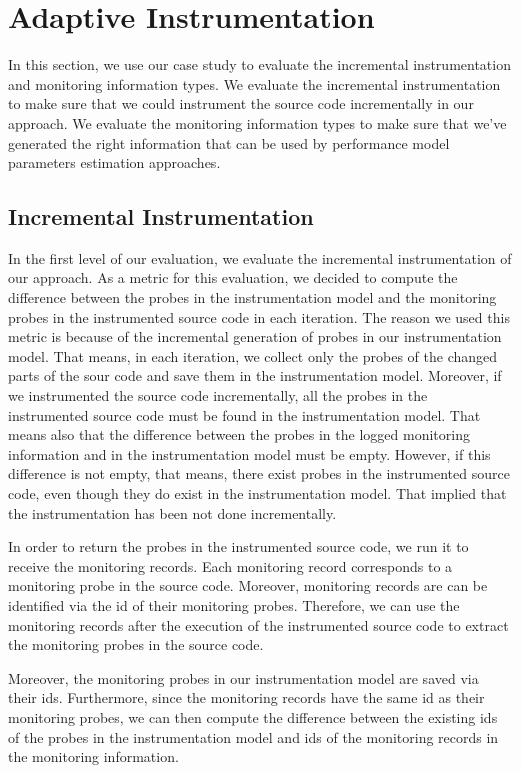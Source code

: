 \section{Adaptive Instrumentation}
\label{sec:Adaptive Instrumentation}
In this section, we use our case study to evaluate the incremental instrumentation and monitoring information types. We evaluate the incremental instrumentation to make sure that we could instrument the source code incrementally in our approach. We evaluate the monitoring information types to make sure that we've generated the right information that can be used by performance model parameters estimation approaches. 

\subsection{Incremental Instrumentation}
\label{sec:Incremental Instrumentation}
In the first level of our evaluation, we evaluate the incremental instrumentation of our approach. As a metric for this evaluation, we decided to compute the difference between the probes in the instrumentation model and the monitoring probes in the instrumented source code in each iteration. The reason we used this metric is because of the incremental generation of probes in our instrumentation model. That means, in each iteration, we collect only the probes of the changed parts of the sour code and save them in the instrumentation model. Moreover, if we instrumented the source code incrementally, all the probes in the instrumented source code must be found in the instrumentation model. That means also that the difference between the probes in the logged monitoring information and in the instrumentation model must be empty. However, if this difference is not empty, that means, there exist probes in the instrumented source code, even though they do exist in the instrumentation model. That implied that the instrumentation has been not done incrementally.

In order to return the probes in the instrumented source code, we run it to receive the monitoring records. Each monitoring record corresponds to a monitoring probe in the source code. Moreover, monitoring records are can be identified via the id of their monitoring probes. Therefore, we can use the monitoring records after the execution of the instrumented source code to extract the monitoring probes in the source code. 

Moreover, the monitoring probes in our instrumentation model are saved via their ids. Furthermore, since the monitoring records have the same id as their monitoring probes, we can then compute the difference between the existing ids of the probes in the instrumentation model and ids of the monitoring records in the monitoring information. 

